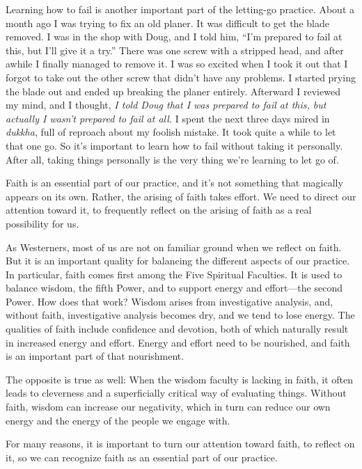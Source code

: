 Learning how to fail is another important part of the letting-go 
practice. About a month ago I was trying to fix an old planer. It was 
difficult to get the blade removed. I was in the shop with Doug, and I 
told him, ``I'm prepared to fail at this, but I'll give it a try.'' 
There was one screw with a stripped head, and after awhile I finally 
managed to remove it. I was so excited when I took it out that I forgot 
to take out the other screw that didn't have any problems. I started 
prying the blade out and ended up breaking the planer entirely. 
Afterward I reviewed my mind, and I thought, \emph{I told Doug that I 
was prepared to fail at this, but actually I wasn't prepared to fail at 
all.} I spent the next three days mired in \emph{dukkha}, full of 
reproach about my foolish mistake. It took quite a while to let that 
one go. So it's important to learn how to fail without taking it 
personally. After all, taking things personally is the very thing we're 
learning to let go of.


Faith is an essential part of our practice, and it's not something that 
magically appears on its own. Rather, the arising of faith takes 
effort. We need to direct our attention toward it, to frequently 
reflect on the arising of faith as a real possibility for us.

As Westerners, most of us are not on familiar ground when we reflect on 
faith. But it is an important quality for balancing the different 
aspects of our practice. In particular, faith comes first among the 
Five Spiritual Faculties. It is used to balance wisdom, the fifth 
Power, and to support energy and effort---the second Power. How does 
that work? Wisdom arises from investigative analysis, and, without 
faith, investigative analysis becomes dry, and we tend to lose energy. 
The qualities of faith include confidence and devotion, both of which 
naturally result in increased energy and effort. Energy and effort need 
to be nourished, and faith is an important part of that nourishment.

The opposite is true as well: When the wisdom faculty is lacking in 
faith, it often leads to cleverness and a superficially critical way of 
evaluating things. Without faith, wisdom can increase our negativity, 
which in turn can reduce our own energy and the energy of the people we 
engage with.

For many reasons, it is important to turn our attention toward faith, 
to reflect on it, so we can recognize faith as an essential part of our 
practice.

